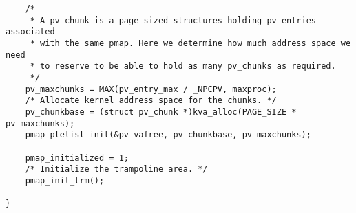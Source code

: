 \documentclass[shortabstract, english]{iithesis}
\newenvironment{code}{}{}
\begin{document}
\begin{code}
\begin{verbatim}
    /*
     * A pv_chunk is a page-sized structures holding pv_entries associated
     * with the same pmap. Here we determine how much address space we need
     * to reserve to be able to hold as many pv_chunks as required.
     */
    pv_maxchunks = MAX(pv_entry_max / _NPCPV, maxproc);
    /* Allocate kernel address space for the chunks. */
    pv_chunkbase = (struct pv_chunk *)kva_alloc(PAGE_SIZE * pv_maxchunks);
    pmap_ptelist_init(&pv_vafree, pv_chunkbase, pv_maxchunks);

    pmap_initialized = 1;
    /* Initialize the trampoline area. */
    pmap_init_trm();

}
\end{verbatim}
\end{code}

\end{document}
